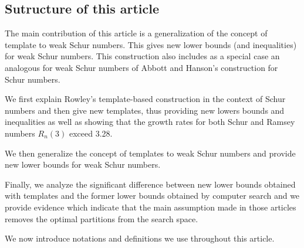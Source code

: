 \subsection{Sutructure of this article}

\par
The main contribution of this article is a generalization of the concept of template to weak Schur numbers. 
This gives new lower bounds (and inequalities) for weak Schur numbers. This construction also includes as a 
special case an analogous for weak Schur numbers of Abbott and Hanson's construction for Schur numbers.

\par
We first explain Rowley's template-based construction in the context of Schur numbers and then give 
new templates, thus providing new lowers bounds and inequalities as well as showing that the growth rates 
for both Schur and Ramsey numbers \(R_n(3)\) exceed 3.28. 

\par
We then  generalize the concept of templates to weak Schur numbers and provide new lower bounds for weak 
Schur numbers. 

\par
Finally, we analyze the significant difference between new lower bounds obtained with templates and the former 
lower bounds obtained by computer search and we provide evidence which indicate that the main assumption 
made in those articles removes the optimal partitions from the search space.

\par
We now introduce notations and definitions we use throughout this article.
